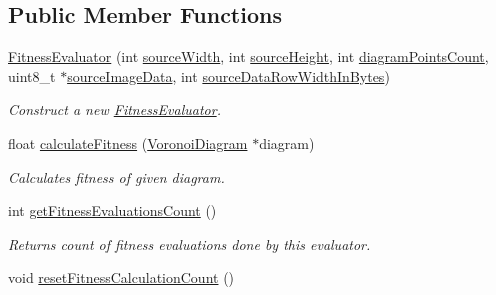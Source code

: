\subsection*{Public Member Functions}
\begin{DoxyCompactItemize}
\item 
\hyperlink{classlossycompressor_1_1_fitness_evaluator_a323cb74e5d3d02d779b91facf1cc2723}{Fitness\+Evaluator} (int \hyperlink{classlossycompressor_1_1_fitness_evaluator_ab24b1f451eece3d50d030145bdb806f7}{source\+Width}, int \hyperlink{classlossycompressor_1_1_fitness_evaluator_a22151a860849a3b8d0d9d3e2f3b46bdf}{source\+Height}, int \hyperlink{classlossycompressor_1_1_fitness_evaluator_aed694c851ddd4648513cd9c249654272}{diagram\+Points\+Count}, uint8\+\_\+t $\ast$\hyperlink{classlossycompressor_1_1_fitness_evaluator_af75273c5e267ab03a3f3f86c7b043a52}{source\+Image\+Data}, int \hyperlink{classlossycompressor_1_1_fitness_evaluator_a09bd546107e628d4e9e5ff57f078bccf}{source\+Data\+Row\+Width\+In\+Bytes})\hypertarget{classlossycompressor_1_1_fitness_evaluator_a323cb74e5d3d02d779b91facf1cc2723}{}\label{classlossycompressor_1_1_fitness_evaluator_a323cb74e5d3d02d779b91facf1cc2723}

\begin{DoxyCompactList}\small\item\em Construct a new \hyperlink{classlossycompressor_1_1_fitness_evaluator}{Fitness\+Evaluator}. \end{DoxyCompactList}\item 
float \hyperlink{classlossycompressor_1_1_fitness_evaluator_a5b469667f1d70ccb2b4326c9627fea40}{calculate\+Fitness} (\hyperlink{structlossycompressor_1_1_voronoi_diagram}{Voronoi\+Diagram} $\ast$diagram)\hypertarget{classlossycompressor_1_1_fitness_evaluator_a5b469667f1d70ccb2b4326c9627fea40}{}\label{classlossycompressor_1_1_fitness_evaluator_a5b469667f1d70ccb2b4326c9627fea40}

\begin{DoxyCompactList}\small\item\em Calculates fitness of given diagram. \end{DoxyCompactList}\item 
int \hyperlink{classlossycompressor_1_1_fitness_evaluator_af96a4665f6e6041e06d7db2771efb9ac}{get\+Fitness\+Evaluations\+Count} ()\hypertarget{classlossycompressor_1_1_fitness_evaluator_af96a4665f6e6041e06d7db2771efb9ac}{}\label{classlossycompressor_1_1_fitness_evaluator_af96a4665f6e6041e06d7db2771efb9ac}

\begin{DoxyCompactList}\small\item\em Returns count of fitness evaluations done by this evaluator. \end{DoxyCompactList}\item 
void \hyperlink{classlossycompressor_1_1_fitness_evaluator_a9251ae55a79031d6bcffbe7dbff34d31}{reset\+Fitness\+Calculation\+Count} ()\hypertarget{classlossycompressor_1_1_fitness_evaluator_a9251ae55a79031d6bcffbe7dbff34d31}{}\label{classlossycompressor_1_1_fitness_evaluator_a9251ae55a79031d6bcffbe7dbff34d31}


\end{DoxyCompactItemize}
